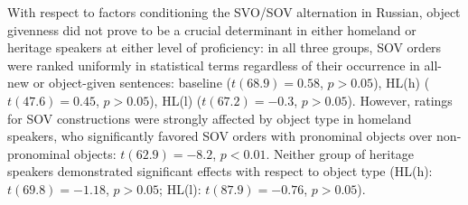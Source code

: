 \documentclass[output=paper]{langscibook}
\begin{document}
With respect to factors conditioning the SVO/SOV alternation in Russian, object givenness did not prove to be a crucial determinant in either homeland or heritage speakers at either level of proficiency: in all three groups, SOV orders were ranked uniformly in statistical terms regardless of their occurrence in all-new or object-given sentences: baseline ($t(68.9) = 0.58$, $p > 0.05$), HL(h) ($t(47.6) = 0.45$, $p > 0.05$), HL(l) ($t(67.2) = -0.3$, $p > 0.05$). However, ratings for SOV constructions were strongly affected by object type in homeland speakers, who significantly favored SOV orders with pronominal objects over non-pronominal objects: $t(62.9) = -8.2$, $p < 0.01$. Neither group of heritage speakers demonstrated significant effects with respect to object type (HL(h): $t(69.8) = -1.18$, $p > 0.05$; HL(l): $t(87.9) = -0.76$, $p > 0.05$).
\end{document}
